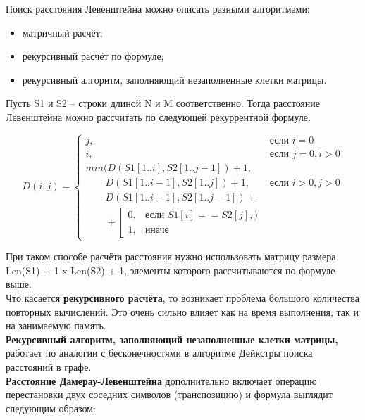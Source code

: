 \documentclass[12pt]{report}
\begin{document}
Поиск расстояния Левенштейна можно описать разными алгоритмами:
\begin{itemize}
\item матричный расчёт;
\item рекурсивный расчёт по формуле;
\item рекурсивный алгоритм, заполняющий незаполненные клетки матрицы.
\end{itemize}

Пусть S1 и S2 – строки длиной N и M соответственно. Тогда расстояние Левенштейна можно рассчитать по следующей рекуррентной формуле:

\begin{equation}
D(i,j) = \left\{ \begin{array}{ll}
 j, & \textrm{$\mbox{если }i = 0$}\\
 i, & \textrm{$\mbox{если }j = 0, i > 0$}\\
min(D(S1[1..i], S2[1.. j - 1])+1,\\
\qquad D(S1[1..i - 1], S2[1..j]) + 1, &\textrm{$\mbox{если }i>0, j>0$}\\
\qquad D(S1[1..i - 1], S2[1..j - 1]) + \\
\qquad+\left[ 
	\begin{array}{ccc}
	0, & \textrm{$\mbox{если }S1[i] == S2[j],)$}\\
	1, & \textrm{иначе}
	\end{array} 
\right.
  \end{array} \right.
\end{equation}

При таком способе расчёта расстояния нужно использовать матрицу размера Len(S1) + 1 x Len(S2) + 1, элементы которого рассчитываются по формуле выше.\\

Что касается \textbf{рекурсивного расчёта}, то возникает проблема большого количества повторных вычислений. Это очень сильно влияет как на время выполнения, так и на занимаемую память.\\

\textbf{Рекурсивный алгоритм, заполняющий незаполненные клетки матрицы,} работает по аналогии с бесконечностями в алгоритме Дейкстры поиска расстояний в графе.\\

\textbf{Расстояние Дамерау-Левенштейна} дополнительно включает операцию перестановки двух соседних символов (транспозицию) и формула выглядит следующим образом:
\end{document}
